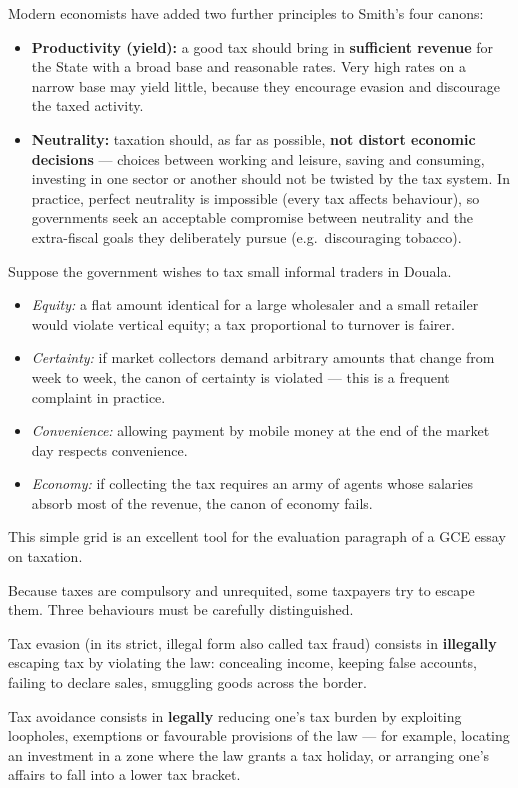 \documentclass[11pt]{article}
\newcommand{\cle}[1]{{\popxbold\color{popdark}#1}}
\newcounter{popsec}
\newcounter{popsub}
\newcommand{\courssub}[1]{%
  \stepcounter{popsub}%
  \par\vspace{9pt}\noindent{\popxbold\fontsize{11.5}{13}\selectfont\color{popink}{\color{poporange}\thepopsec.\thepopsub}\hspace{6pt}#1}\par\nopagebreak\vspace{4pt}
}
\begin{document}
Modern economists have added two further principles to Smith's four canons:

\begin{itemize}
\item \textbf{Productivity (yield):} a good tax should bring in \textbf{sufficient revenue} for the State with a broad base and reasonable rates. Very high rates on a narrow base may yield little, because they encourage evasion and discourage the taxed activity.
\item \textbf{Neutrality:} taxation should, as far as possible, \textbf{not distort economic decisions} — choices between working and leisure, saving and consuming, investing in one sector or another should not be twisted by the tax system. In practice, perfect neutrality is impossible (every tax affects behaviour), so governments seek an acceptable compromise between neutrality and the extra-fiscal goals they deliberately pursue (e.g.\ discouraging tobacco).
\end{itemize}

\begin{exemplebox}
Suppose the government wishes to tax small informal traders in Douala.
\begin{itemize}
\item \emph{Equity:} a flat amount identical for a large wholesaler and a small retailer would violate vertical equity; a tax proportional to turnover is fairer.
\item \emph{Certainty:} if market collectors demand arbitrary amounts that change from week to week, the canon of certainty is violated — this is a frequent complaint in practice.
\item \emph{Convenience:} allowing payment by mobile money at the end of the market day respects convenience.
\item \emph{Economy:} if collecting the tax requires an army of agents whose salaries absorb most of the revenue, the canon of economy fails.
\end{itemize}
This simple grid is an excellent tool for the evaluation paragraph of a GCE essay on taxation.
\end{exemplebox}

\courssub{Tax Evasion, Tax Avoidance and Tax Fraud}

Because taxes are compulsory and unrequited, some taxpayers try to escape them. Three behaviours must be carefully distinguished.

\begin{definition}
\cle{Tax evasion} (in its strict, illegal form also called \cle{tax fraud}) consists in \textbf{illegally} escaping tax by violating the law: concealing income, keeping false accounts, failing to declare sales, smuggling goods across the border.

\cle{Tax avoidance} consists in \textbf{legally} reducing one's tax burden by exploiting loopholes, exemptions or favourable provisions of the law — for example, locating an investment in a zone where the law grants a tax holiday, or arranging one's affairs to fall into a lower tax bracket.
\end{definition}
\end{document}
